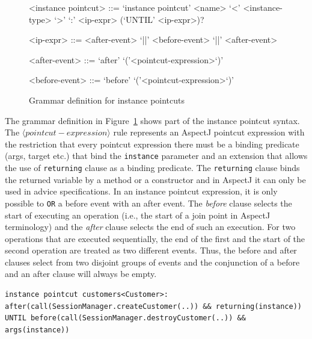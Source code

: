 \documentclass{llncs}
\begin{document}
\begin{figure}[h!]
\begin{grammar}
<instance pointcut> ::= `instance pointcut' <name> `<' <instance-type> `>' `:'
<ip-expr> (`UNTIL' <ip-expr>)? 

<ip-expr> ::= <after-event> `||' <before-event>  `||' <after-event>  

<after-event> ::= `after' `('<pointcut-expression>`)'

<before-event> ::= `before' `('<pointcut-expression>`)'
\end{grammar}
\caption{Grammar definition for instance pointcuts}
\label{fig:grammar1}
\end{figure}

The grammar definition in Figure~\ref{fig:grammar1} shows part of the instance pointcut syntax. 
The $\langle pointcut-expression\rangle$ rule represents an AspectJ pointcut expression with the restriction that every pointcut expression there must be a binding predicate (args, target etc.) that bind the \texttt{instance} parameter and an extension that allows the use of \texttt{returning} clause as a binding predicate. The \texttt{returning} clause binds the returned variable by a method or a constructor and in AspectJ it can only be used in advice specifications. 
In an instance pointcut expression, it is only possible to \texttt{OR} a before event with an after event. 
The \emph{before} clause selects the start of executing an operation (i.e., the start of a join point in AspectJ terminology) and the \emph{after} clause selects the end of such an execution. 
For two operations that are executed sequentially, the end of the first and the start of the second operation are treated as two different events. Thus, the before and after clauses select from two disjoint groups of events and the conjunction of a before and an after clause will always be empty.



\begin{lstlisting}[float=h!, caption={A basic instance pointcut declaration with add and remove expressions}, label={lst:basic}]
instance pointcut customers<Customer>: after(call(SessionManager.createCustomer(..)) && returning(instance)) UNTIL before(call(SessionManager.destroyCustomer(..)) && args(instance))
\end{lstlisting}
\end{document}
